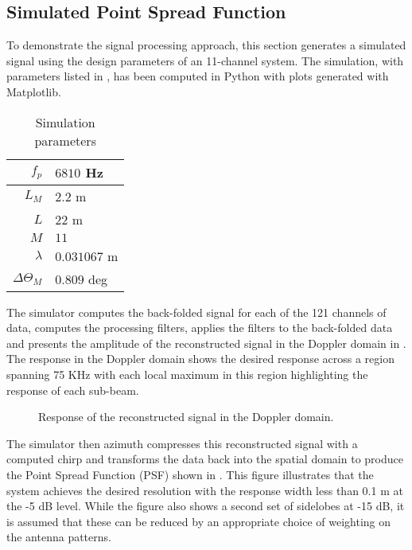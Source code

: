 \documentclass[journal]{IEEEtran}
\newcommand{\antennaLength}{\ensuremath{L}}
\newcommand{\antennaLengthEffective}{\ensuremath{L_M}}
\newcommand{\wavelength}{\ensuremath{\lambda}}
\newcommand{\threeDBEffective}{\ensuremath{\Theta_{M}}}
\newcommand{\prf}{\ensuremath{f_p}}
\begin{document}
\subsection{Simulated Point Spread Function}
To demonstrate the signal processing approach, this section generates a simulated signal using the design parameters of an 11-channel system. The simulation, with parameters listed in , has been computed in Python with plots generated with Matplotlib.
\begin{table}[h!]
\begin{center}
 \caption{Simulation parameters}
 \label{tb:simulation}
 \begin{tabular}{r|l}
  $\prf$ & $6810$ Hz\\\hline
  $\antennaLengthEffective$ & $2.2$ m\\\hline
  $\antennaLength$ & $22$ m\\\hline
  $M$ & $11$\\\hline
  $\wavelength$ & $0.031067$ m\\\hline
  $\Delta\threeDBEffective$ & $0.809$ deg
 \end{tabular}
 \end{center}
\end{table}
The simulator computes the back-folded signal for each of the 121 channels of data, computes the processing filters, applies the filters to the back-folded data and presents the amplitude of the reconstructed signal in the Doppler domain in . The response in the Doppler domain shows the desired response across a region spanning 75 KHz with each local maximum in this region highlighting the response of each sub-beam.
\begin{figure}[h!]
\begin{center}
 \resizebox{\columnwidth}{!}{}
 \caption{Response of the reconstructed signal in the Doppler domain.}
 \label{fg:reconstructed}
 \end{center}
\end{figure}
The simulator then azimuth compresses this reconstructed signal with a computed chirp and transforms the data back into the spatial domain to produce the Point Spread Function (PSF) shown in . This figure illustrates that the system achieves the desired resolution with the response width less than 0.1 m at the -5 dB level. While the figure also shows a second set of sidelobes at -15 dB, it is assumed that these can be reduced by an appropriate choice of weighting on the antenna patterns. 
\end{document}
